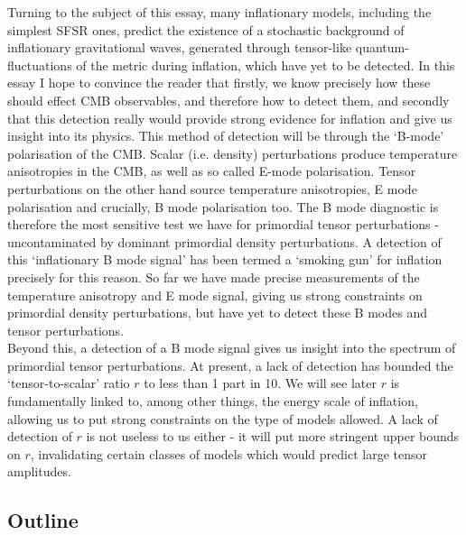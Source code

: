 \documentclass[a4paper,10pt]{article}
\begin{document}
Turning to the subject of this essay, many inflationary models, including the simplest SFSR ones, predict the existence of a stochastic background of inflationary gravitational waves, generated through tensor-like quantum-fluctuations of the metric during inflation, which have yet to be detected. In this essay I hope to convince the reader that firstly, we know precisely how these should effect CMB observables, and therefore how to detect them, and secondly that this detection really would provide strong evidence for inflation and give us insight into its physics. This method of detection will be through the `B-mode' polarisation of the CMB. Scalar (i.e. density) perturbations produce temperature anisotropies in the CMB, as well as so called E-mode polarisation. Tensor perturbations on the other hand source temperature anisotropies, E mode polarisation and crucially, B mode polarisation too. The B mode diagnostic is therefore the most sensitive test we have for primordial tensor perturbations - uncontaminated by dominant primordial density perturbations. A detection of this `inflationary B mode signal' has been termed a `smoking gun' for inflation precisely for this reason. So far we have made precise measurements of the temperature anisotropy and E mode signal, giving us strong constraints on primordial density perturbations, but have yet to detect these B modes and tensor perturbations. \\

Beyond this, a detection of a B mode signal gives us insight into the spectrum of primordial tensor perturbations. At present, a lack of detection has bounded the `tensor-to-scalar' ratio $r$ to less than 1 part in 10. We will see later $r$ is fundamentally linked to, among other things, the energy scale of inflation, allowing us to put strong constraints on the type of models allowed. A lack of detection of $r$ is not useless to us either - it will put more stringent upper bounds on $r$, invalidating certain classes of models which would predict large tensor amplitudes.\\

\subsection{Outline}
\end{document}

